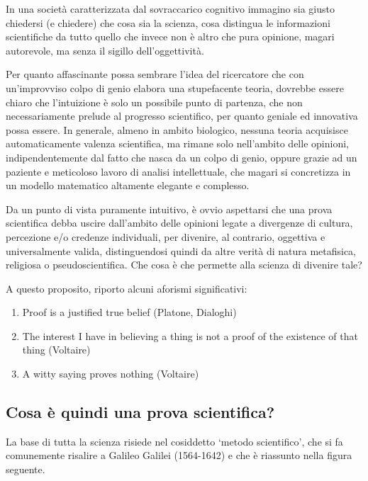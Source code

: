 \documentclass[a4paper,12pt,oneside]{book}
\providecommand{\tightlist}{%
  \setlength{\itemsep}{0pt}\setlength{\parskip}{0pt}}
\begin{document}
In una società caratterizzata dal sovraccarico cognitivo immagino sia
giusto chiedersi (e chiedere) che cosa sia la scienza, cosa distingua le
informazioni scientifiche da tutto quello che invece non è altro che
pura opinione, magari autorevole, ma senza il sigillo dell'oggettività.

Per quanto affascinante possa sembrare l'idea del ricercatore che con
un'improvviso colpo di genio elabora una stupefacente teoria, dovrebbe
essere chiaro che l'intuizione è solo un possibile punto di partenza,
che non necessariamente prelude al progresso scientifico, per quanto
geniale ed innovativa possa essere. In generale, almeno in ambito
biologico, nessuna teoria acquisisce automaticamente valenza
scientifica, ma rimane solo nell'ambito delle opinioni,
indipendentemente dal fatto che nasca da un colpo di genio, oppure
grazie ad un paziente e meticoloso lavoro di analisi intellettuale, che
magari si concretizza in un modello matematico altamente elegante e
complesso.

Da un punto di vista puramente intuitivo, è ovvio aspettarsi che una
prova scientifica debba uscire dall'ambito delle opinioni legate a
divergenze di cultura, percezione e/o credenze individuali, per
divenire, al contrario, oggettiva e universalmente valida,
distinguendosi quindi da altre verità di natura metafisica, religiosa o
pseudoscientifica. Che cosa è che permette alla scienza di divenire
tale?

A questo proposito, riporto alcuni aforismi significativi:

\begin{enumerate}
\def\labelenumi{\arabic{enumi}.}
\tightlist
\item
  Proof is a justified true belief (Platone, Dialoghi)
\item
  The interest I have in believing a thing is not a proof of the
  existence of that thing (Voltaire)
\item
  A witty saying proves nothing (Voltaire)
\end{enumerate}

\subsection{Cosa è quindi una prova
scientifica?}\label{cosa-e-quindi-una-prova-scientifica}

La base di tutta la scienza risiede nel cosiddetto `metodo scientifico',
che si fa comunemente risalire a Galileo Galilei (1564-1642) e che è
riassunto nella figura seguente.
\end{document}
